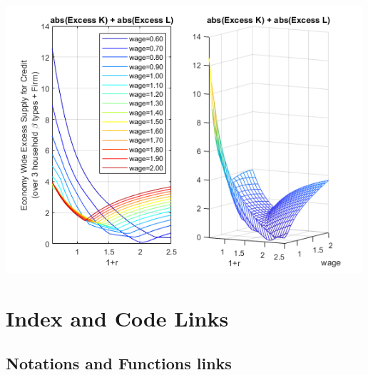 \documentclass[
]{book}
\begin{document}
\includegraphics[width=5.20833in,height=\textheight]{img/equilibrium_constrainedborrow_labor_images/figure_3.png}

\hypertarget{appendix-appendix}{%
\appendix}


\hypertarget{index-and-code-links}{%
\chapter{Index and Code Links}\label{index-and-code-links}}

\hypertarget{notations-and-functions-links}{%
\section{Notations and Functions links}\label{notations-and-functions-links}}
\end{document}
